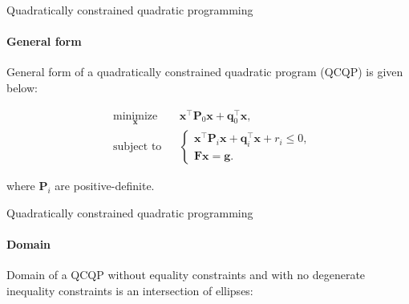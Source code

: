 \documentclass{beamer}
\begin{document}
\begin{frame}{Quadratically constrained quadratic programming}
\framesubtitle{General form}
\begin{flushleft}

General form of a quadratically constrained quadratic program (QCQP) is given below:

%
\begin{equation}
\begin{aligned}
& \underset{\mathbf{x}}{\text{minimize}}
& & \mathbf{x}^\top \mathbf{P}_0 \mathbf{x} + \mathbf{q}_0^\top\mathbf{x}, \\
& \text{subject to}
& & \begin{cases}
    \mathbf{x}^\top \mathbf{P}_i \mathbf{x} + \mathbf{q}_i^\top\mathbf{x} + r_i \leq 0, \\
    \mathbf{F}\mathbf{x} = \mathbf{g}.
    \end{cases}
\end{aligned}
\end{equation}

where $\mathbf{P}_i$ are positive-definite.
 
\end{flushleft}
\end{frame}



\begin{frame}{Quadratically constrained quadratic programming}
\framesubtitle{Domain}
\begin{flushleft}

Domain of a QCQP without equality constraints and with no degenerate inequality constraints is an intersection of ellipses:

\begin{figure} [h!]
\begin{center}

\end{center} 
\end{figure}
 
\end{flushleft}
\end{frame}
\end{document}
